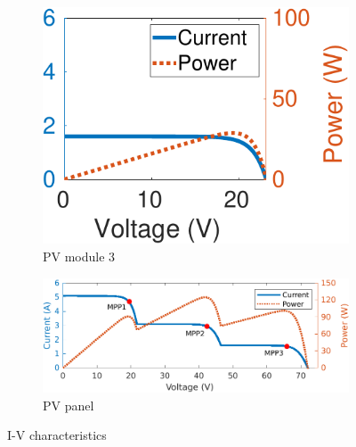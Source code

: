 \documentclass[conference]{pvsctran}
\begin{document}
\begin{figure}
\begin{subfigure}[b]{0.3\linewidth}
        \includegraphics[width=\linewidth]{../fig/m_3.png}
        \caption{PV module 3}
    \end{subfigure}
    \hfill
    \begin{subfigure}[b]{\linewidth}
        \centering
        \vspace{3mm}
        \includegraphics[width=\linewidth]{../fig/panel.png}
        \caption{PV panel}
    \end{subfigure}
    \caption{I-V characteristics}
    \label{fig:IV}
\end{figure}
\end{document}

